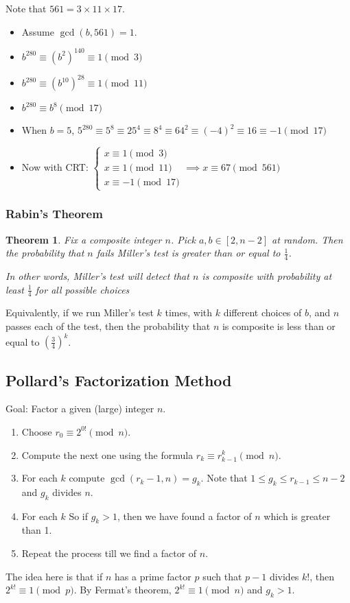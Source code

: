 \documentclass[letterpaper,12pt,oneside]{article}
\newtheorem{theorem}{Theorem}
\begin{document}
Note that $561 = 3 \times 11 \times 17$. \begin{itemize}
    \item Assume $\gcd(b,561)=1$. 
    \item $b^{280}\equiv (b^2)^{140}\equiv 1 \pmod 3$ 
    \item $b^{280}\equiv (b^{10})^{28}\equiv 1 \pmod {11}$
    \item $b^{280}\equiv b^8 \pmod {17}$
    \item When $b=5$, $5^{280}\equiv 5^8 \equiv 25^4\equiv 8^4\equiv 64^2\equiv (-4)^2\equiv 16\equiv -1 \pmod {17}$
    \item Now with CRT: $\begin{cases}
        x\equiv 1 \pmod 3 \\
        x\equiv 1 \pmod {11} \\
        x\equiv -1 \pmod {17}
    \end{cases}
    \implies x\equiv 67 \pmod {561}$
\end{itemize}
\subsubsection{Rabin's Theorem}
\begin{theorem}
    Fix a composite integer $n$. Pick $a,b\in [2,n-2]$ at random. Then the probability that $n$ fails Miller's test is greater than or equal to $\frac{1}{4}$.

    In other words, Miller's test will detect that $n$ is composite with probability at least $\frac{1}{4}$ for all possible choices
\end{theorem}
Equivalently, if we run Miller's test $k$ times, with $k$ different choices of $b$, and $n$ passes each of the test, then the probability that $n$ is composite is less than or equal to $(\frac{3}{4})^k$.
\subsection{Pollard's Factorization Method}
Goal: Factor a given (large) integer $n$.

\begin{enumerate}
    \item Choose $r_0\equiv 2^{0!}\pmod n$.
    \item Compute the next one using the formula $r_k\equiv r_{k-1}^{k} \pmod n$.
    \item For each $k$ compute $\gcd(r_{k}-1,n)=g_k$. Note that $1\le g_k \le r_{k-1} \le n-2$ and $g_k$ divides $n$.
    \item For each $k$  So if $g_k > 1$, then we have found a factor of $n$ which is greater than 1.
    \item Repeat the process till we find a factor of $n$.
\end{enumerate}
The idea here is that if $n$ has a prime factor $p$ such that $p-1$ divides $k!$, then $2^{k!}\equiv 1 \pmod p$. By Fermat's theorem,  $2^{k!}\equiv 1 \pmod n$ and $g_k>1$. 
\end{document}
